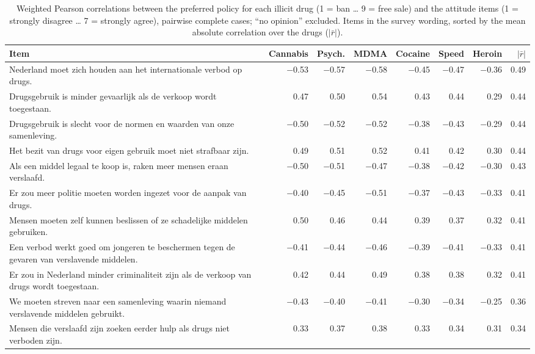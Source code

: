 \begin{table}[H]
\centering\scriptsize
\caption{Weighted Pearson correlations between the preferred policy for each illicit drug (1 = ban \ldots{} 9 = free sale) and the attitude items (1 = strongly disagree \ldots{} 7 = strongly agree), pairwise complete cases; ``no opinion'' excluded. Items in the survey wording, sorted by the mean absolute correlation over the drugs ($|\bar{r}|$).}
\label{tab:attitude_correlations}
\begin{tabularx}{\linewidth}{@{}Xrrrrrrr@{}}
\toprule
Item & Cannabis & Psych. & MDMA & Cocaine & Speed & Heroin & $|\bar{r}|$ \\
\midrule
Nederland moet zich houden aan het internationale verbod op drugs. & $-$0.53 & $-$0.57 & $-$0.58 & $-$0.45 & $-$0.47 & $-$0.36 & 0.49 \\
Drugsgebruik is minder gevaarlijk als de verkoop wordt toegestaan. & 0.47 & 0.50 & 0.54 & 0.43 & 0.44 & 0.29 & 0.44 \\
Drugsgebruik is slecht voor de normen en waarden van onze samenleving. & $-$0.50 & $-$0.52 & $-$0.52 & $-$0.38 & $-$0.43 & $-$0.29 & 0.44 \\
Het bezit van drugs voor eigen gebruik moet niet strafbaar zijn. & 0.49 & 0.51 & 0.52 & 0.41 & 0.42 & 0.30 & 0.44 \\
Als een middel legaal te koop is, raken meer mensen eraan verslaafd. & $-$0.50 & $-$0.51 & $-$0.47 & $-$0.38 & $-$0.42 & $-$0.30 & 0.43 \\
Er zou meer politie moeten worden ingezet voor de aanpak van drugs. & $-$0.40 & $-$0.45 & $-$0.51 & $-$0.37 & $-$0.43 & $-$0.33 & 0.41 \\
Mensen moeten zelf kunnen beslissen of ze schadelijke middelen gebruiken. & 0.50 & 0.46 & 0.44 & 0.39 & 0.37 & 0.32 & 0.41 \\
Een verbod werkt goed om jongeren te beschermen tegen de gevaren van verslavende middelen. & $-$0.41 & $-$0.44 & $-$0.46 & $-$0.39 & $-$0.41 & $-$0.33 & 0.41 \\
Er zou in Nederland minder criminaliteit zijn als de verkoop van drugs wordt toegestaan. & 0.42 & 0.44 & 0.49 & 0.38 & 0.38 & 0.32 & 0.41 \\
We moeten streven naar een samenleving waarin niemand verslavende middelen gebruikt. & $-$0.43 & $-$0.40 & $-$0.41 & $-$0.30 & $-$0.34 & $-$0.25 & 0.36 \\
Mensen die verslaafd zijn zoeken eerder hulp als drugs niet verboden zijn. & 0.33 & 0.37 & 0.38 & 0.33 & 0.34 & 0.31 & 0.34 \\

\end{tabularx}
\end{table}
